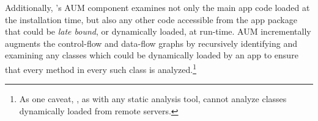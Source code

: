 Additionally, \@approach's AUM component
examines not only the main app code loaded at the
installation time, but also any other code accessible
from the app package that could be \emph{late bound}, or dynamically loaded, at run-time.
AUM incrementally augments the control-flow and
data-flow graphs by recursively identifying and
examining any classes which could be dynamically loaded by an app to
ensure that every method in every such class is
analyzed.\footnote{As one caveat, \@approach, as with any static analysis tool, cannot analyze classes dynamically loaded from remote servers.}
  
  

\begin{figure}[t!]%
        
\end{figure}

